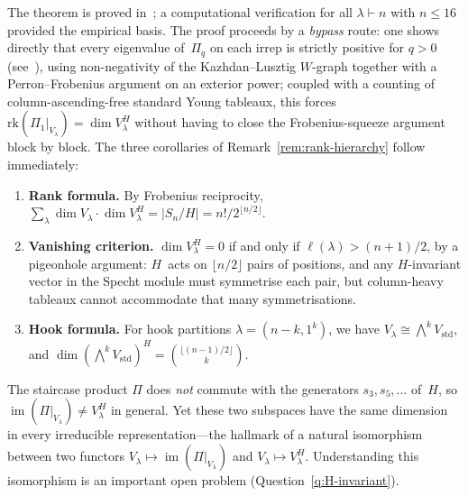 The theorem is proved in~\cite{clio-h-invariant-2026}; a computational
verification for all $\lambda \vdash n$ with $n \leq 16$ provided the
empirical basis.  The proof proceeds by a \emph{bypass} route: one shows
directly that every eigenvalue of~$\Pi_q$ on each irrep is strictly
positive for $q > 0$ (see~\cite{clio-eigenvalue-positivity-2026}), using
non-negativity of the Kazhdan--Lusztig $W$-graph together with a
Perron--Frobenius argument on an exterior power; coupled with a
counting of column-ascending-free standard Young tableaux, this forces
$\mathrm{rk}(\Pi_1|_{V_\lambda}) = \dim V_\lambda^H$ without having to
close the Frobenius-squeeze argument block by block.  The three corollaries of
Remark~\ref{rem:rank-hierarchy} follow immediately:

\begin{enumerate}[label=(\roman*)]
\item \textbf{Rank formula.}  By Frobenius reciprocity,
  $\sum_\lambda \dim V_\lambda \cdot \dim V_\lambda^H
  = |S_n/H| = n!/2^{\lfloor n/2 \rfloor}$.
\item \textbf{Vanishing criterion.}  $\dim V_\lambda^H = 0$ if and
  only if $\ell(\lambda) > (n+1)/2$, by a pigeonhole argument:
  $H$~acts on $\lfloor n/2 \rfloor$ pairs of positions, and any
  $H$-invariant vector in the Specht module must symmetrise each pair,
  but column-heavy tableaux cannot accommodate that many symmetrisations.
\item \textbf{Hook formula.}  For hook partitions
  $\lambda = (n-k, 1^k)$, we have $V_\lambda \cong \bigwedge^k V_{\mathrm{std}}$,
  and $\dim(\bigwedge^k V_{\mathrm{std}})^H = \binom{\lfloor(n-1)/2\rfloor}{k}$.
\end{enumerate}

\begin{remark}
\label{rem:two-functors}
The staircase product $\Pi$ does \emph{not} commute with the
generators $s_3, s_5, \ldots$ of~$H$, so $\operatorname{im}(\Pi|_{V_\lambda})
\neq V_\lambda^H$ in general.  Yet these two subspaces have the same
dimension in every irreducible representation---the hallmark of a
natural isomorphism between two functors $V_\lambda \mapsto
\operatorname{im}(\Pi|_{V_\lambda})$ and $V_\lambda \mapsto V_\lambda^H$.
Understanding this isomorphism is an important open problem
(Question~\ref{q:H-invariant}).
\end{remark}

